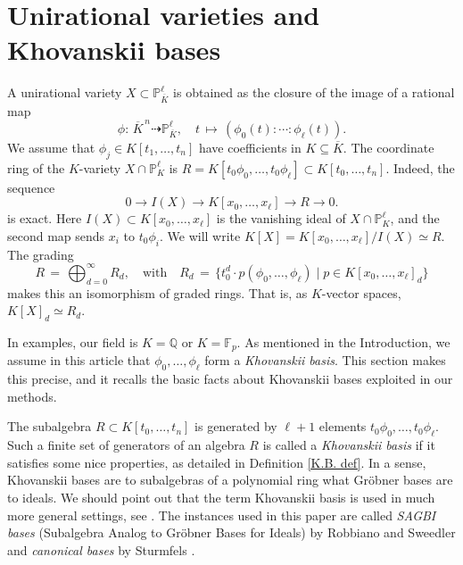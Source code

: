 \documentclass[12pt]{article}
\theoremstyle{definition}
\theoremstyle{remark}
\begin{document}
\section{Unirational varieties and Khovanskii bases} \label{sec:2}

A unirational variety $X \subset \mathbb{P}^\ell_{\overline{K}}$ is obtained as the closure of the image of a rational map 
\[ \phi: \, {\overline{K}}^{\,n} \dashrightarrow \mathbb{P}^\ell_{\overline{K}}, \quad t \, \mapsto \, (\phi_0(t) : \cdots : \phi_\ell(t)). \]
We assume that $\phi_j \in K[t_1, \ldots, t_n]$ have coefficients in $K \subseteq \overline{K}$. The coordinate ring of the $K$-variety $X\cap \mathbb{P}_K^\ell$ is $R = K[t_0\phi_0,\dots,t_0\phi_\ell]\subset K[t_0,\dots, t_n]$. Indeed, the sequence
\[ 0 \longrightarrow I(X) \longrightarrow K[x_0, \ldots, x_\ell] \longrightarrow R \longrightarrow 0.\]
is exact. Here $I(X) \subset K[x_0, \ldots, x_\ell]$ is the vanishing ideal of $X\cap \mathbb{P}_K^\ell$, and the second map sends $x_i$ to $t_0 \phi_i$. We will write $K[X] = K[x_0,\ldots, x_\ell]/I(X) \simeq R$. The grading
\begin{equation} \label{eq:gradingR} R \, = \, \bigoplus_{d = 0}^\infty R_d, \quad \text{with} \quad R_d \, = \, \{ t_0^d\cdot p(\phi_0,\dots,\phi_\ell) \mid p\in K[x_0,\dots,x_\ell]_d  \} 
\end{equation}
makes this an isomorphism of graded rings. That is, as $K$-vector spaces, $K[X]_d \simeq R_d$.


In examples, our field is $K = \mathbb{Q}$ or $K = \mathbb{F}_p$. As mentioned in the Introduction, we assume in this article that $\phi_0, \ldots, \phi_\ell$ form a \emph{Khovanskii basis}. This section makes this precise, and it recalls the basic facts about Khovanskii bases exploited in our methods. 


The subalgebra $R \subset K[t_0, \ldots, t_n]$ is generated by $\ell + 1$ elements $t_0 \phi_0, \ldots, t_0\phi_\ell$. Such a finite set of generators of an algebra $R$ is called a \emph{Khovanskii basis} if it satisfies some nice properties, as detailed in Definition \ref{K.B. def}.
In a sense, Khovanskii bases are to subalgebras of a polynomial ring what Gröbner bases are to ideals. We should point out that the term Khovanskii basis is used in much more general settings, see \cite{kaveh2012newton,kaveh2019khovanskii}. The instances used in this paper are called \emph{SAGBI bases} (Subalgebra Analog to Gröbner Bases for Ideals) by Robbiano and Sweedler \cite{robbiano2006subalgebra} and \emph{canonical bases} by Sturmfels \cite{sturmfelsgroebner}. 
\end{document}
